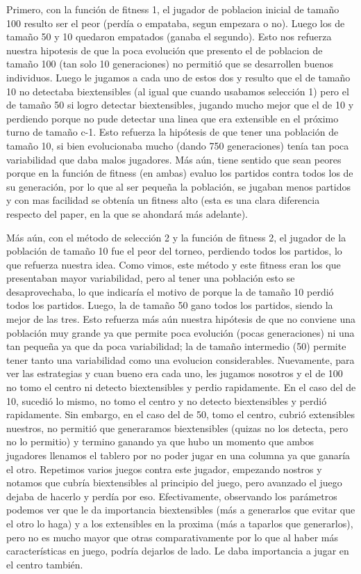 \documentclass[A4paper,oneside,fleqn,11pt]{article}
\theoremstyle{definition}
\begin{document}
Primero, con la función de fitness 1, el jugador de poblacion inicial de tamaño 100 resulto ser el peor (perdía o empataba, segun empezara o no). Luego los de tamaño 50 y 10 quedaron empatados (ganaba el segundo). Esto nos refuerza nuestra hipotesis de que la poca evolución que presento el de poblacion de tamaño 100 (tan solo 10 generaciones) no permitió que se desarrollen buenos individuos. Luego le jugamos a cada uno de estos dos y resulto que el de tamaño 10 no detectaba biextensibles (al igual que cuando usabamos selección 1) pero el de tamaño 50 si logro detectar biextensibles, jugando mucho mejor que el de 10 y perdiendo porque no pude detectar una linea que era extensible en el próximo turno de tamaño c-1. Esto refuerza la hipótesis de que tener una población de tamaño 10, si bien evolucionaba mucho (dando 750 generaciones) tenía tan poca variabilidad que daba malos jugadores. Más aún, tiene sentido que sean peores porque en la función de fitness (en ambas) evaluo los partidos contra todos los de su generación, por lo que al ser pequeña la población, se jugaban menos partidos y con mas facilidad se obtenía un fitness alto (esta es una clara diferencia respecto del paper, en la que se ahondará más adelante). 

Más aún, con el método de selección 2 y la función de fitness 2, el jugador de la población de tamaño 10 fue el peor del torneo, perdiendo todos los partidos, lo que refuerza nuestra idea. Como vimos, este método y este fitness eran los que presentaban mayor variabilidad, pero al tener una población esto se desaprovechaba, lo que indicaría el motivo de porque la de tamaño 10 perdió todos los partidos. Luego, la de tamaño 50 gano todos los partidos, siendo la mejor de las tres. Esto refuerza más aún nuestra hipótesis de que no conviene una población muy grande ya que permite poca evolución (pocas generaciones) ni una tan pequeña ya que da poca variabilidad; la de tamaño intermedio (50) permite tener tanto una variabilidad como una evolucion considerables. Nuevamente, para ver las estrategias y cuan bueno era cada uno, les jugamos nosotros y el de 100 no tomo el centro ni detecto biextensibles y perdio rapidamente. En el caso del de 10, sucedió lo mismo, no tomo el centro y no detecto biextensibles y perdió rapidamente. Sin embargo, en el caso del de 50, tomo el centro, cubrió extensibles nuestros, no permitió que generaramos biextensibles (quizas no los detecta, pero no lo permitio) y termino ganando ya que hubo un momento que ambos jugadores llenamos el tablero por no poder jugar en una columna ya que ganaría el otro.  Repetimos varios juegos contra este jugador, empezando nostros y notamos que cubría biextensibles al principio del juego, pero avanzado el juego dejaba de hacerlo y perdía por eso. Efectivamente, observando los parámetros podemos ver que le da importancia biextensibles (más a generarlos que evitar que el otro lo haga) y a los extensibles en la proxima (más a taparlos que generarlos), pero no es mucho mayor que otras comparativamente por lo que al haber más características en juego, podría dejarlos de lado. Le daba importancia a jugar en el centro también.
\end{document}
